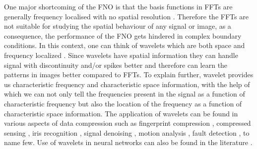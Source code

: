 \documentclass{article}
\begin{document}
One major shortcoming of the FNO is that the basis functions in FFTs are generally frequency localised with no spatial resolution \cite{bachman2000fourier}. Therefore the FFTs are not suitable for studying the spatial behaviour of any signal or image, as a consequence, the performance of the FNO gets hindered in complex boundary conditions. In this context, one can think of wavelets which are both space and frequency localized \cite{bachman2000fourier,boggess2015first}. Since wavelets have spatial information they can handle signal with discontinuity and/or spikes better and therefore can learn the patterns in images better compared to FFTs.
To explain further, wavelet provides us characteristic frequency and characteristic space information, with the help of which we can not only tell the frequencies present in the signal as a function of characteristic frequency but also the location of the frequency as a function of characteristic space information. 
The application of wavelets can be found in various aspects of data compression such as fingerprint compression \cite{wirsing2020time}, compressed sensing \cite{mallat1992singularity}, iris recognition \cite{cho2002method}, signal denoising \cite{sheybani2011dimensionality}, motion analysis \cite{martin2011novel}, fault detection \cite{liu2012shannon}, to name few. Use of wavelets in neural networks can also be found in the literature \cite{zhang1995wavelet,xu2019graph,shervani2020chemical,gupta2021multiwavelet}.
\end{document}
